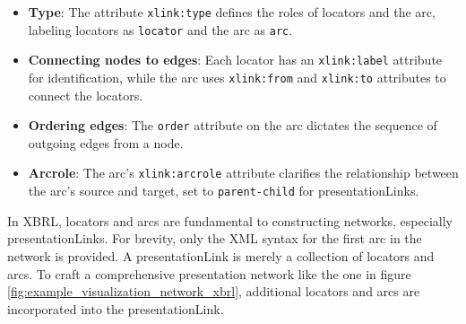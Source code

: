 \begin{itemize}
    \item \textbf{Type}: The attribute \texttt{xlink:type} defines the roles of locators and the arc, labeling locators as \texttt{locator} and the arc as \texttt{arc}.
    \item \textbf{Connecting nodes to edges}: Each locator has an \texttt{xlink:label} attribute for identification, while the arc uses \texttt{xlink:from} and \texttt{xlink:to} attributes to connect the locators.
    \item \textbf{Ordering edges}: The \texttt{order} attribute on the arc dictates the sequence of outgoing edges from a node.
    \item \textbf{Arcrole}: The arc's \texttt{xlink:arcrole} attribute clarifies the relationship between the arc's source and target, set to \texttt{parent-child} for presentationLinks.
\end{itemize}

In XBRL, locators and arcs are fundamental to constructing networks, especially presentationLinks.
For brevity, only the XML syntax for the first arc in the network is provided.
A presentationLink is merely a collection of locators and arcs.
To craft a comprehensive presentation network like the one in figure \ref{fig:example_visualization_network_xbrl}, additional locators and arcs are incorporated into the presentationLink.





